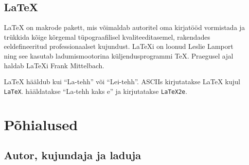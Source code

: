 \subsection{\LaTeX}

\LaTeX{} on makrode pakett, mis võimaldab autoritel oma kirjatööd
vormistada ja trükkida kõige kõrgemal tüpograafilisel kvaliteeditasemel,
rakendades eeldefineeritud professionaalset kujundust. \LaTeX i on
loonud Leslie Lamport~\cite{manual} ning see
kasutab ladumismootorina küljendusprogrammi \TeX. Praegusel ajal haldab
\LaTeX i Frank Mittelbach.


\LaTeX{} hääldub kui "`La-tehh"' või "`Lei-tehh"'. ASCIIs
kirjutatakse \LaTeX{} kujul \texttt{LaTeX}. \LaTeXe{}
hääldatakse "`La-tehh kaks e"' ja kirjutatakse \texttt{LaTeX2e}.


%

\section{Põhialused}

\subsection{Autor, kujundaja ja laduja}

